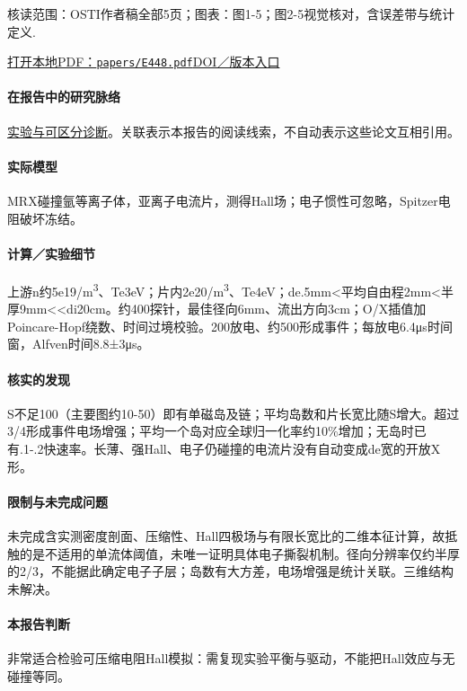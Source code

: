\textsf{核读范围：}OSTI作者稿全部5页；\textsf{图表：}图1-5；图2-5视觉核对，含误差带与统计定义.

\href{run:papers/E448.pdf}{打开本地PDF：\texttt{papers/E448.pdf}}\quad\href{https://doi.org/10.1103/physrevlett.117.095001}{DOI／版本入口}

\paragraph{在报告中的研究脉络}\hyperref[story:diagnostic]{实验与可区分诊断}。关联表示本报告的阅读线索，不自动表示这些论文互相引用。

\paragraph{实际模型}MRX碰撞氩等离子体，亚离子电流片，测得Hall场；电子惯性可忽略，Spitzer电阻破坏冻结。

\paragraph{计算／实验细节}上游n约5e19/m\textsuperscript{3}、Te3eV；片内2e20/m\textsuperscript{3}、Te4eV；de.5mm<平均自由程2mm<半厚9mm<<di20cm。约400探针，最佳径向6mm、流出方向3cm；O/X插值加Poincare-Hopf绕数、时间过境校验。200放电、约500形成事件；每放电6.4μs时间窗，Alfven时间8.8±3μs。

\paragraph{核实的发现}S不足100（主要图约10-50）即有单磁岛及链；平均岛数和片长宽比随S增大。超过3/4形成事件电场增强；平均一个岛对应全球归一化率约10\%增加；无岛时已有.1-.2快速率。长薄、强Hall、电子仍碰撞的电流片没有自动变成de宽的开放X形。

\paragraph{限制与未完成问题}未完成含实测密度剖面、压缩性、Hall四极场与有限长宽比的二维本征计算，故抵触的是不适用的单流体阈值，未唯一证明具体电子撕裂机制。径向分辨率仅约半厚的2/3，不能据此确定电子子层；岛数有大方差，电场增强是统计关联。三维结构未解决。

\paragraph{本报告判断}非常适合检验可压缩电阻Hall模拟：需复现实验平衡与驱动，不能把Hall效应与无碰撞等同。

